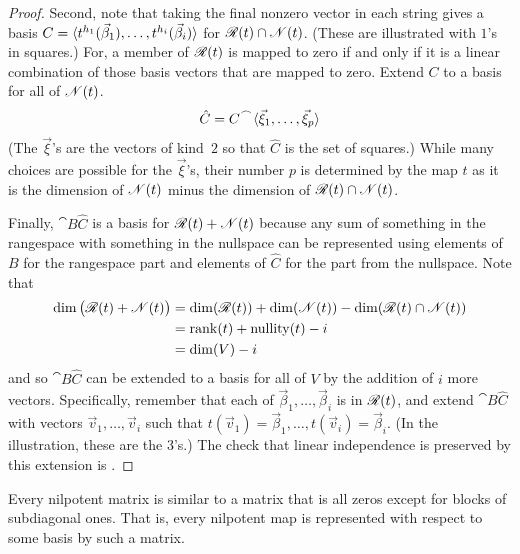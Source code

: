 \begin{proof}
Second, note that taking the final nonzero vector in each string
gives a basis
\( C=\langle t^{h_1}(\vec{\beta}_1),\dots,t^{h_i}(\vec{\beta}_i)\rangle \)
for \( \mathscr{R}(t)\cap\mathscr{N}(t) \).
(These are illustrated with \( 1 \)'s in squares.)
For, a member of \( \mathscr{R}(t) \) is mapped to zero if and only
if it is a linear combination of those basis vectors that are mapped
to zero.
Extend \( C \) to a basis for all of \( \mathscr{N}(t) \).
\begin{equation*}
  \hat{C}=\cat{C}{\sequence{\vec{\xi}_1,\dots,\vec{\xi}_p}}
\end{equation*}
(The $\vec{\xi}$'s are the vectors of kind~\( 2 \) 
so that \( \hat{C} \) is the set of squares.)
While many choices are possible for the \( \vec{\xi} \)'s,
their number \( p \) is determined by the map \( t \) as it is the dimension of
\( \mathscr{N}(t) \) minus the dimension of
\( \mathscr{R}(t)\cap\mathscr{N}(t) \).

Finally, \( \cat{B}{\hat{C}} \)
is a basis for \( \mathscr{R}(t)+\mathscr{N}(t) \)
because any sum of something in the rangespace with something in the nullspace
can be represented using elements of \( B \) for the rangespace 
part and elements of \( \hat{C} \) for the part from the nullspace.
Note that
\begin{align*}
  \dim\big(\mathscr{R}(t)+\mathscr{N}(t)\big)
  &=
  \dim (\mathscr{R}(t))+\dim (\mathscr{N}(t))
    -\dim(\mathscr{R}(t)\cap\mathscr{N}(t))  \\
  &=
  \operatorname{rank} (t)+\operatorname{nullity} (t)-i          \\
  &=
  \dim (V)-i
\end{align*}
and so \( \cat{B}{\hat{C}} \) can be extended to a basis for all of 
\( V \) by the addition of \( i \) more vectors.
Specifically, remember that each of \( \vec{\beta}_1,\dots,\vec{\beta}_i \) is
in \( \mathscr{R}(t) \), and extend \( \cat{B}{\hat{C}} \) with vectors
\( \vec{v}_1,\dots,\vec{v}_i \) such that
\( t(\vec{v}_1)=\vec{\beta}_1,\dots,t(\vec{v}_i)=\vec{\beta}_i \).
(In the illustration, these are the \( 3 \)'s.)
The check that linear independence is preserved by this extension is
.
\end{proof}

\begin{corollary}
Every nilpotent matrix is similar to a matrix that is all zeros
except for blocks of subdiagonal ones.
That is, every nilpotent map is represented with respect to some basis by
such a matrix.
\end{corollary}


